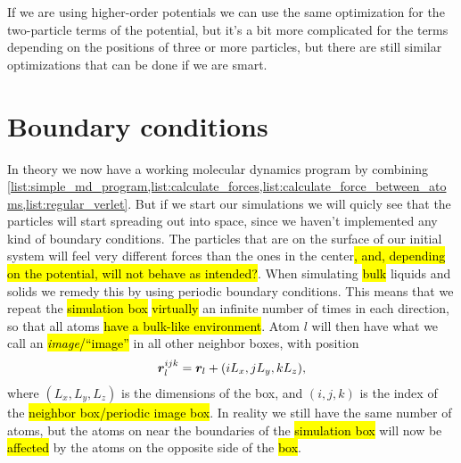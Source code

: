 If we are using higher-order potentials we can use the same optimization for the two-particle terms of the potential, but it's a bit more complicated for the terms depending on the positions of three or more particles, but there are still similar optimizations that can be done if we are smart.




\section{Boundary conditions}
In theory we now have a working molecular dynamics program by combining \cref{list:simple_md_program,list:calculate_forces,list:calculate_force_between_atoms,list:regular_verlet}. But if we start our simulations we will quicly see that the particles will start spreading out into space, since we haven't implemented any kind of boundary conditions. The particles that are on the surface of our initial system will feel very different forces than the ones in the center\hl{, and, depending on the potential, will not behave as intended?}. When simulating \hl{bulk} liquids and solids we remedy this by using periodic boundary conditions. This means that we repeat the \hl{simulation box} \hl{virtually} an infinite number of times in each direction, so that all atoms \hl{have a bulk-like environment}. Atom $l$ will then have what we call an \hl{\emph{image}/``image''} in all other neighbor boxes, with position
\begin{align}
    \boldsymbol{r}_l^{ijk} = \boldsymbol{r}_l + (iL_x, jL_y, kL_z),
    \label{eq:pbc_positions}
\end{align}
where $(L_x, L_y, L_z)$ is the dimensions of the box, and $(i, j, k)$ is the index of the \hl{neighbor box/periodic image box}. In reality we still have the same number of atoms, but the atoms on near the boundaries of the \hl{simulation box} will now be \hl{affected} by the atoms on the opposite side of the \hl{box}.

